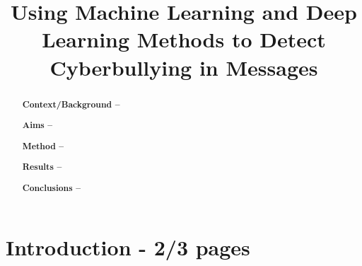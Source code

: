 \documentclass[12pt,a4paper]{article}
\title{Using Machine Learning and Deep Learning Methods to Detect Cyberbullying in Messages}
\author{} %
\date{}
\begin{document}
\maketitle


 


\begin{abstract}


	{\bf Context/Background -- }
	
	{\bf Aims -- }
	
	{\bf Method -- }
	
	{\bf Results -- }
	
	{\bf Conclusions -- }
\end{abstract}

\begin{keywords}
\end{keywords}



\section{Introduction - 2/3 pages}
\end{document}
